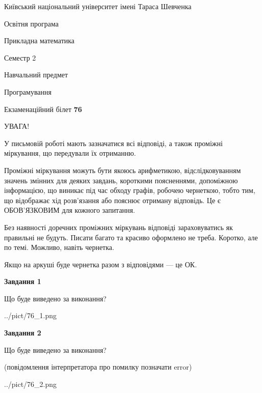 \documentclass[12pt, ukrainian]{article}
\begin{document}
{{\begin {small}\par
{ \center  Київський національний університет імені Тараса Шевченка \par}
{\parbox {5 cm}{Освітня програма \hfill}{\parbox {7 cm}{Прикладна математика\hfill}}\parbox {6 cm}{\hfill Семестр 2}}\par
{\parbox {5 cm} {Навчальний предмет \hfill}\parbox {7 cm}{Програмування \hfill}\parbox {6cm}{\hfill}\par}\vspace{-7pt} \end{small}}{\center Екзаменаційний білет \No \textbf
{ 76 }\par}}
{
\begin {large}
УВАГА!

У письмовій роботі мають зазначатися всі відповіді, а також проміжні міркування, що передували їх отриманню.

Проміжні міркування можуть бути якоюсь арифметикою, відслідковуванням зна\-чень змінних для деяких завдань,
короткими поясненнями, допоміжною інформацією, що виникає під час обходу графів, робочею чернеткою,
тобто тим, що відображає хід розв’язання або пояснює отриману відповідь.
Це є ОБОВ’ЯЗКОВИМ для кожного запитання.

Без наявності доречних проміжних міркувань відповіді зараховуватись як правиль\-ні не будуть.
Писати багато та красиво оформлено не треба. Коротко, але по темі. Можли\-во, навіть чернетка.

Якщо на аркуші буде чернетка разом з відповідями --- це ОК.

\newpage

{\begin {center}\textbf{Завдання 1}\end {center}}\par
Що буде виведено за виконання?\par
\begin{center}
	{../pict/76_1.png}
\end{center}
\newpage

{\begin {center}\textbf{Завдання 2}\end {center}}\par
Що буде виведено за виконання?\par
 (повідомлення інтерпретатора про помилку позначати error)\par
\begin{center}
	{../pict/76_2.png}
\end{center}
\newpage


\end{large}}
\end{document}
